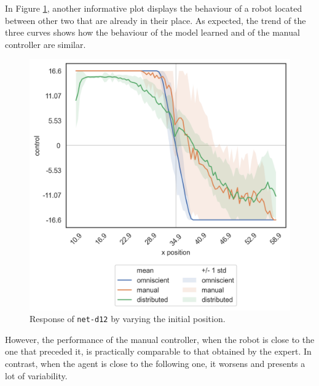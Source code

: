 In Figure \ref{fig:net-d12responseposition}, another informative plot displays 
the behaviour of a robot located between other two that are already in their place.
As expected, the trend of the three curves shows how the behaviour of the 
model learned and of the manual controller are similar.
\begin{figure}[!htb]
	\centering
	\includegraphics[width=.45\textwidth]{contents/images/net-d12/response-varying_init_position-distributed}%
	\caption{Response of \texttt{net-d12} by varying the initial position.}
	\label{fig:net-d12responseposition}
\end{figure}
However, the performance of the manual controller, when the robot is close to 
the one that preceded it, is practically comparable to that obtained by the 
expert.
In contrast, when the agent is close to the following one, it worsens and 
presents a lot of variability.


